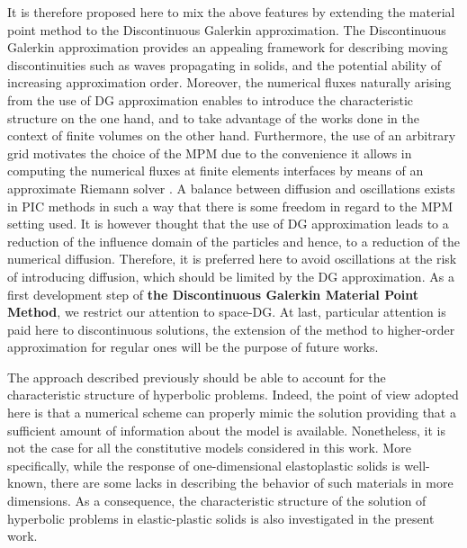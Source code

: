 It is therefore proposed here to mix the above features by extending the material point method to the Discontinuous Galerkin approximation.
The Discontinuous Galerkin approximation provides an appealing framework for describing moving discontinuities such as waves propagating in solids, and the potential ability of increasing approximation order.
Moreover, the numerical fluxes naturally arising from the use of DG approximation enables to introduce the characteristic structure on the one hand, and to take advantage of the works done in the context of finite volumes on the other hand.
Furthermore, the use of an arbitrary grid motivates the choice of the MPM due to the convenience it allows in computing the numerical fluxes at finite elements interfaces by means of an approximate Riemann solver \cite{Toro}.
A balance between diffusion and oscillations exists in PIC methods in such a way that there is some freedom in regard to the MPM setting used.
It is however thought that the use of DG approximation leads to a reduction of the influence domain of the particles and hence, to a reduction of the numerical diffusion. 
Therefore, it is preferred here to avoid oscillations at the risk of introducing diffusion, which should be limited by the DG approximation.
As a first development step of \textbf{the Discontinuous Galerkin Material Point Method}, we restrict our attention to space-DG.
At last, particular attention is paid here to discontinuous solutions, the extension of the method to higher-order approximation for regular ones will be the purpose of future works.

The approach described previously should be able to account for the characteristic structure of hyperbolic problems.
Indeed, the point of view adopted here is that a numerical scheme can properly mimic the solution providing that a sufficient amount of information about the model is available.
Nonetheless, it is not the case for all the constitutive models considered in this work.
More specifically, while the response of one-dimensional elastoplastic solids is well-known, there are some lacks in describing the behavior of such materials in more dimensions. 
As a consequence, the characteristic structure of the solution of hyperbolic problems in elastic-plastic solids is also investigated in the present work.








